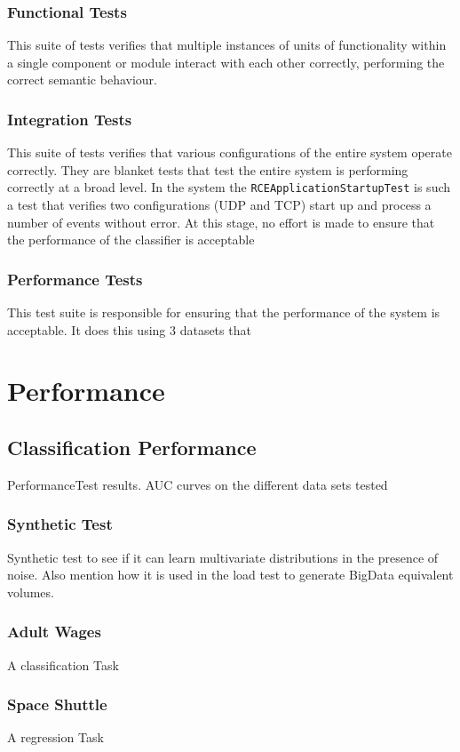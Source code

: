 \documentclass[a4paper,11pt]{scrreprt}
\begin{document}
\subsection{Functional Tests}
This suite of tests verifies that multiple instances of units of functionality within a single component or module interact with each other correctly, performing the correct semantic behaviour.
\subsection{Integration Tests}
This suite of tests verifies that various configurations of the entire system operate correctly. They are blanket tests that test the entire system is performing correctly at a broad level. In the system the \verb|RCEApplicationStartupTest| is such a test that verifies two configurations (UDP and TCP) start up and process a number of events without error. At this stage, no effort is made to ensure that the performance of the classifier is acceptable
\subsection{Performance Tests}
This test suite is responsible for ensuring that the performance of the system is acceptable. It does this using 3 datasets that 

\chapter{Performance}
\section{Classification Performance}
PerformanceTest results. AUC curves on the different data sets tested
\subsection{Synthetic Test}
Synthetic test to see if it can learn multivariate distributions in the presence of noise. Also mention how it is used in the load test to generate BigData equivalent volumes.
\subsection{Adult Wages}
A classification Task
\subsection{Space Shuttle}
A regression Task
\end{document}
